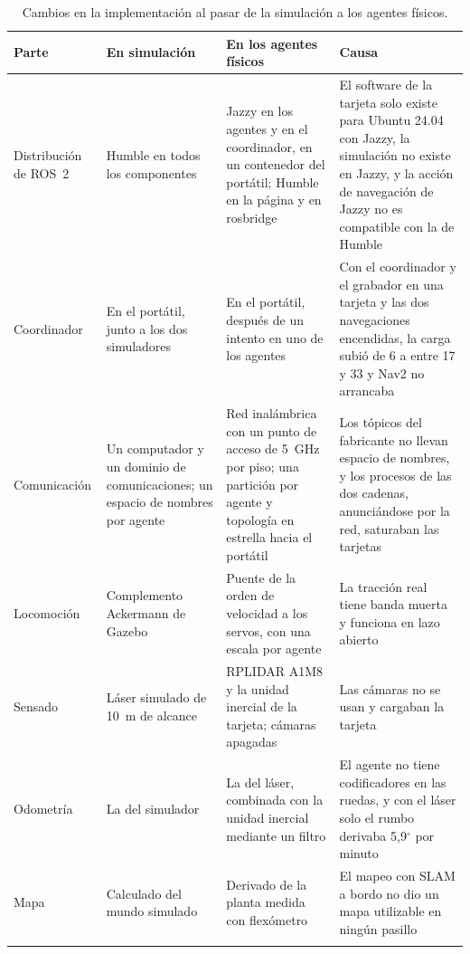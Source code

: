 \begin{table}[H]
  \centering\footnotesize{}
  \caption{Cambios en la implementación al pasar de la simulación a los agentes físicos.}
  \label{tab:sim-vehiculos}
  \begin{tabular}{@{}>{\raggedright\arraybackslash}p{}>{\raggedright\arraybackslash}p{}>{\raggedright\arraybackslash}p{}>{\raggedright\arraybackslash}p{}@{}}
    \toprule
    \textbf{Parte} & \textbf{En simulación} & \textbf{En los agentes físicos} & \textbf{Causa} \\ \midrule
    Distribución de ROS~2 & Humble en todos los componentes & Jazzy en los agentes y en el coordinador, en un contenedor del portátil; Humble en la página y en rosbridge & El software de la tarjeta solo existe para Ubuntu 24.04 con Jazzy, la simulación no existe en Jazzy, y la acción de navegación de Jazzy no es compatible con la de Humble \\ \addlinespace
    Coordinador & En el portátil, junto a los dos simuladores & En el portátil, después de un intento en uno de los agentes & Con el coordinador y el grabador en una tarjeta y las dos navegaciones encendidas, la carga subió de 6 a entre 17 y 33 y Nav2 no arrancaba \\ \addlinespace
    Comunicación & Un computador y un dominio de comunicaciones; un espacio de nombres por agente & Red inalámbrica con un punto de acceso de 5~GHz por piso; una partición por agente y topología en estrella hacia el portátil & Los tópicos del fabricante no llevan espacio de nombres, y los procesos de las dos cadenas, anunciándose por la red, saturaban las tarjetas \\ \addlinespace
    Locomoción & Complemento Ackermann de Gazebo & Puente de la orden de velocidad a los servos, con una escala por agente & La tracción real tiene banda muerta y funciona en lazo abierto \\ \addlinespace
    Sensado & Láser simulado de 10~m de alcance & RPLIDAR A1M8 y la unidad inercial de la tarjeta; cámaras apagadas & Las cámaras no se usan y cargaban la tarjeta \\ \addlinespace
    Odometría & La del simulador & La del láser, combinada con la unidad inercial mediante un filtro & El agente no tiene codificadores en las ruedas, y con el láser solo el rumbo derivaba 5,9$^\circ$ por minuto \\ \addlinespace
    Mapa & Calculado del mundo simulado & Derivado de la planta medida con flexómetro & El mapeo con SLAM a bordo no dio un mapa utilizable en ningún pasillo \\ \addlinespace

\end{tabular}
\end{table}
